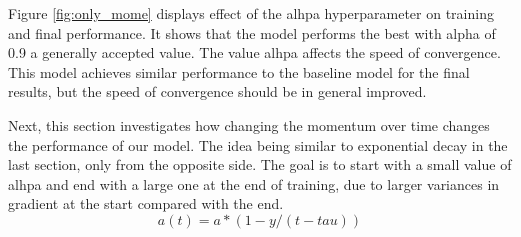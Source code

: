 \documentclass[12pt]{article}
\begin{document}
Figure \ref{fig:only_mome} displays effect of the alhpa hyperparameter on training and final performance. It shows that the model performs the best with alpha of 0.9 a generally accepted value. The value alhpa affects the speed of convergence. This model achieves similar performance to the baseline model for the final results, but the speed of convergence should be in general improved.

Next, this section investigates how changing the momentum over time changes the performance of our model. The idea being similar to exponential decay in the last section, only from the opposite side. The goal is to start with a small value of alhpa and end with a large one at the end of training, due to larger variances in gradient at the start compared with the end.
\[ a(t) = a*(1-y/{(t-tau)})\] 
\end{document}
